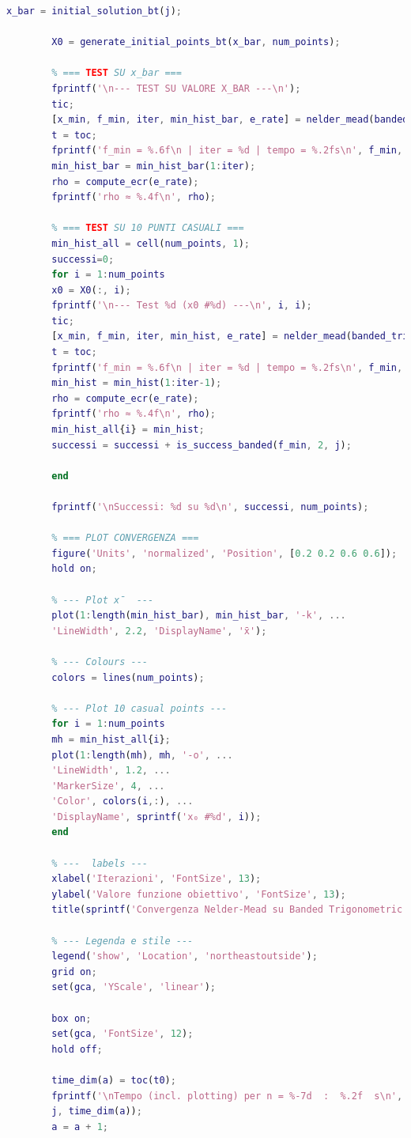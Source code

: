 \documentclass[a4paper,12pt]{article}
\begin{document}
\begin{lstlisting}[language=Matlab,caption={Full script: Nelder Mead Method on all function},label={lst:rosenbrock-extended}]
		x_bar = initial_solution_bt(j);
		
		X0 = generate_initial_points_bt(x_bar, num_points);
		
		% === TEST SU x_bar ===
		fprintf('\n--- TEST SU VALORE X_BAR ---\n');
		tic;
		[x_min, f_min, iter, min_hist_bar, e_rate] = nelder_mead(banded_trigonometric, x_bar, tol, max_iter);
		t = toc;
		fprintf('f_min = %.6f\n | iter = %d | tempo = %.2fs\n', f_min, iter, t);
		min_hist_bar = min_hist_bar(1:iter);
		rho = compute_ecr(e_rate);
		fprintf('rho ≈ %.4f\n', rho);
		
		% === TEST SU 10 PUNTI CASUALI ===
		min_hist_all = cell(num_points, 1);
		successi=0;
		for i = 1:num_points
		x0 = X0(:, i);
		fprintf('\n--- Test %d (x0 #%d) ---\n', i, i);
		tic;
		[x_min, f_min, iter, min_hist, e_rate] = nelder_mead(banded_trigonometric, x0, tol, max_iter);
		t = toc;
		fprintf('f_min = %.6f\n | iter = %d | tempo = %.2fs\n', f_min, iter, t);
		min_hist = min_hist(1:iter-1);
		rho = compute_ecr(e_rate);
		fprintf('rho ≈ %.4f\n', rho);
		min_hist_all{i} = min_hist;
		successi = successi + is_success_banded(f_min, 2, j);
		
		end
		
		fprintf('\nSuccessi: %d su %d\n', successi, num_points);
		
		% === PLOT CONVERGENZA ===
		figure('Units', 'normalized', 'Position', [0.2 0.2 0.6 0.6]);  
		hold on;
		
		% --- Plot x̄  ---
		plot(1:length(min_hist_bar), min_hist_bar, '-k', ...
		'LineWidth', 2.2, 'DisplayName', 'x̄');
		
		% --- Colours ---
		colors = lines(num_points);
		
		% --- Plot 10 casual points ---
		for i = 1:num_points
		mh = min_hist_all{i};
		plot(1:length(mh), mh, '-o', ...
		'LineWidth', 1.2, ...
		'MarkerSize', 4, ...
		'Color', colors(i,:), ...
		'DisplayName', sprintf('x₀ #%d', i));
		end
		
		% ---  labels ---
		xlabel('Iterazioni', 'FontSize', 13);
		ylabel('Valore funzione obiettivo', 'FontSize', 13);
		title(sprintf('Convergenza Nelder-Mead su Banded Trigonometric (n = %d)', j), 'FontSize', 14); 
		
		% --- Legenda e stile ---
		legend('show', 'Location', 'northeastoutside');
		grid on;
		set(gca, 'YScale', 'linear');  
		
		box on;
		set(gca, 'FontSize', 12);   
		hold off;
		
		time_dim(a) = toc(t0);
		fprintf('\nTempo (incl. plotting) per n = %-7d  :  %.2f  s\n', ...
		j, time_dim(a));
		a = a + 1;
		

\end{lstlisting}
\end{document}
